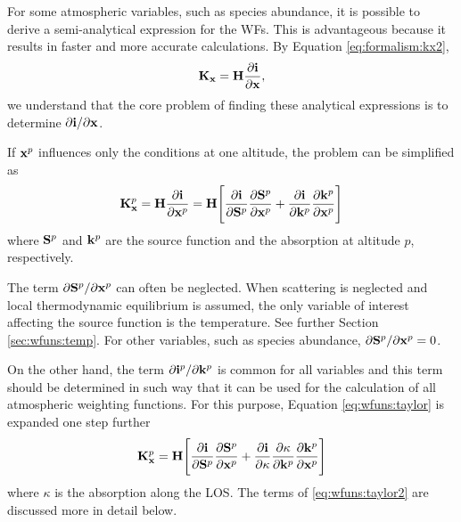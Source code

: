   For some atmospheric variables, such as species abundance, it is
  possible to derive a semi-analytical expression for the WFs. This is
  advantageous because it results in faster and more accurate
  calculations. By Equation \ref{eq:formalism:kx2},
  \begin{eqnarray*}
    \mathbf{K_x} = \mathbf{H}\frac{\partial\mathbf{i}}{\partial \mathbf{x}},
  \end{eqnarray*}
  we understand that the core problem of finding these analytical
  expressions is to determine $\partial\mathbf{i} / \partial \mathbf{x}$. 
  
  If $\mathbf{x}^p$ influences only the conditions at one altitude, the
  problem can be simplified as \citep[][Eq. 43]{eriksson:00a}
  \begin{equation}
    \mathbf{K}_{\mathbf{x}}^p = \mathbf{H} \frac{\partial\mathbf{i}}{\partial \mathbf{x}^p} = 
      \mathbf{H} \Bigg[ \frac{\partial\mathbf{i}}{\partial \mathbf{S}^p}
                 \frac{\partial \mathbf{S}^p}{\partial \mathbf{x}^p} +
                 \frac{\partial\mathbf{i}}{\partial \mathbf{k}^p}
                 \frac{\partial \mathbf{k}^p}{\partial \mathbf{x}^p} \Bigg]
   \label{eq:wfuns:taylor}
  \end{equation}
  where $\mathbf{S}^p$ and $\mathbf{k}^p$ are the source function and the
  absorption at altitude $p$, respectively.
  
  The term $\partial \mathbf{S}^p/\partial \mathbf{x}^p$ can often be neglected.
  When scattering is neglected and local thermodynamic equilibrium is
  assumed, the only variable of interest affecting the source function
  is the temperature.  See further Section \ref{sec:wfuns:temp}. For
  other variables, such as species abundance, $\partial
  \mathbf{S}^p/\partial \mathbf{x}^p=0$.
  
  On the other hand, the term $\partial \mathbf{i}^p/\partial \mathbf{k}^p$ is
  common for all variables and this term should be determined in such
  way that it can be used for the calculation of all atmospheric
  weighting functions. For this purpose, Equation
  \ref{eq:wfuns:taylor} is expanded one step further
  \begin{equation}
    \mathbf{K}_{\mathbf{x}}^p = \mathbf{H} \Bigg[ \frac{\partial\mathbf{i}}{\partial \mathbf{S}^p}
                 \frac{\partial \mathbf{S}^p}{\partial \mathbf{x}^p} +
                 \frac{\partial\mathbf{i}}{\partial \kappa}
                 \frac{\partial \kappa}{\partial \mathbf{k}^p}
                 \frac{\partial \mathbf{k}^p}{\partial \mathbf{x}^p} \Bigg]
   \label{eq:wfuns:taylor2}
  \end{equation}
  where $\kappa$ is the absorption along the LOS.  The terms of
  \ref{eq:wfuns:taylor2} are discussed more in detail below.
  
